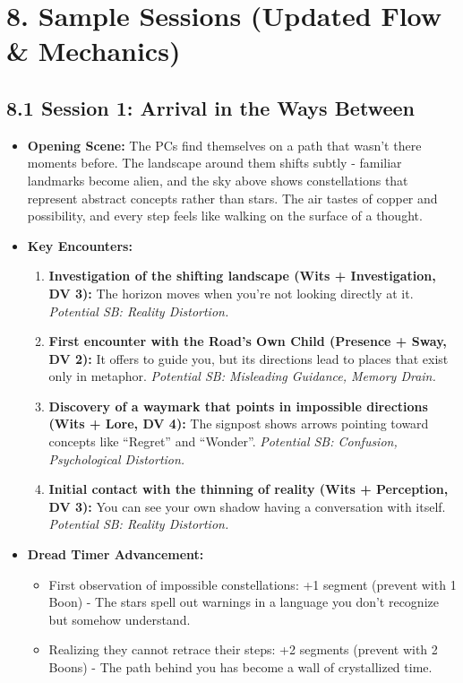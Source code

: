 \documentclass[11pt]{article}
\begin{document}
\section*{8. Sample Sessions (Updated Flow \& Mechanics)}

\subsection*{8.1 Session 1: Arrival in the Ways Between}

\begin{itemize}
\item \textbf{Opening Scene:} The PCs find themselves on a path that wasn't there moments before. The landscape around them shifts subtly - familiar landmarks become alien, and the sky above shows constellations that represent abstract concepts rather than stars. The air tastes of copper and possibility, and every step feels like walking on the surface of a thought.
\item \textbf{Key Encounters:}
\begin{enumerate}
\item \textbf{Investigation of the shifting landscape (Wits + Investigation, DV 3):} The horizon moves when you're not looking directly at it. \textit{Potential SB: Reality Distortion.}
\item \textbf{First encounter with the Road's Own Child (Presence + Sway, DV 2):} It offers to guide you, but its directions lead to places that exist only in metaphor. \textit{Potential SB: Misleading Guidance, Memory Drain.}
\item \textbf{Discovery of a waymark that points in impossible directions (Wits + Lore, DV 4):} The signpost shows arrows pointing toward concepts like ``Regret'' and ``Wonder''. \textit{Potential SB: Confusion, Psychological Distortion.}
\item \textbf{Initial contact with the thinning of reality (Wits + Perception, DV 3):} You can see your own shadow having a conversation with itself. \textit{Potential SB: Reality Distortion.}
\end{enumerate}
\item \textbf{Dread Timer Advancement:}
\begin{itemize}
\item First observation of impossible constellations: +1 segment (prevent with 1 Boon) - The stars spell out warnings in a language you don't recognize but somehow understand.
\item Realizing they cannot retrace their steps: +2 segments (prevent with 2 Boons) - The path behind you has become a wall of crystallized time.

\end{itemize}
\end{itemize}
\end{document}
